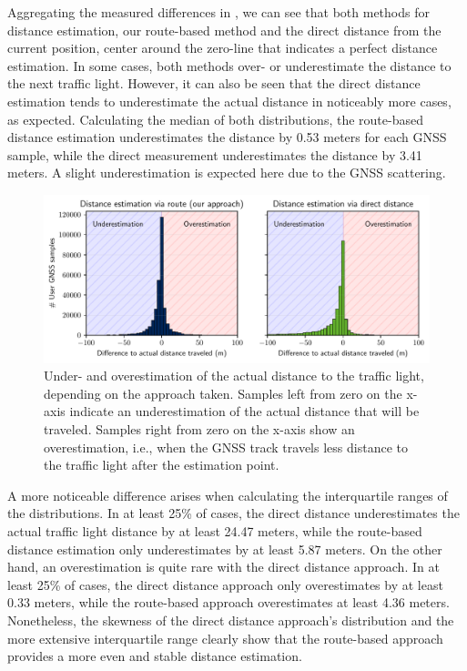 Aggregating the measured differences in , we can see that both methods for distance estimation, our route-based method and the direct distance from the current position, center around the zero-line that indicates a perfect distance estimation. In some cases, both methods over- or underestimate the distance to the next traffic light. However, it can also be seen that the direct distance estimation tends to underestimate the actual distance in noticeably more cases, as expected. Calculating the median of both distributions, the route-based distance estimation underestimates the distance by 0.53 meters for each GNSS sample, while the direct measurement underestimates the distance by 3.41 meters. A slight underestimation is expected here due to the GNSS scattering.

\begin{figure}[t]
\centering 
\includegraphics[width=\linewidth]{images/routing-distance-distribution.pdf}
\caption{Under- and overestimation of the actual distance to the traffic light, depending on the approach taken. Samples left from zero on the x-axis indicate an underestimation of the actual distance that will be traveled. Samples right from zero on the x-axis show an overestimation, i.e., when the GNSS track travels less distance to the traffic light after the estimation point.}
\label{fig:routing-distance-distribution}
\end{figure}

A more noticeable difference arises when calculating the interquartile ranges of the distributions. In at least 25\% of cases, the direct distance underestimates the actual traffic light distance by at least 24.47 meters, while the route-based distance estimation only underestimates by at least 5.87 meters. On the other hand, an overestimation is quite rare with the direct distance approach. In at least 25\% of cases, the direct distance approach only overestimates by at least 0.33 meters, while the route-based approach overestimates at least 4.36 meters. Nonetheless, the skewness of the direct distance approach's distribution and the more extensive interquartile range clearly show that the route-based approach provides a more even and stable distance estimation.

